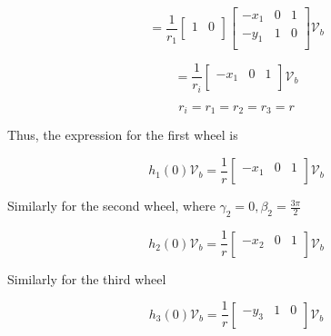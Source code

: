 \documentclass[12pt, twoside]{report}
\begin{document}
\begin{equation}
    = \frac{1}{r_1} \left[\begin{array}{cc}
            1 & 0 \\
        \end{array}\right]
    \begin{bmatrix}
        -x_1 & 0 & 1 \\
        -y_1 & 1 & 0 \\
    \end{bmatrix}
    \mathcal{V}_b
\end{equation}

\begin{equation}
    =
    \frac{1}{r_i}
    \begin{bmatrix}
        -x_1 & 0 & 1 \\
    \end{bmatrix}
    \mathcal{V}_b
\end{equation}

\begin{equation}
    r_i = r_1 = r_2 = r_3 = r
\end{equation}

Thus, the expression for the first wheel is

\begin{equation}
    h_1(0) \mathcal{V}_b = \frac{1}{r}
    \begin{bmatrix}
        -x_1 & 0 & 1 \\
    \end{bmatrix}
    \mathcal{V}_b
\end{equation}


Similarly for the second wheel, where $\gamma_2 = 0, \beta_2 = \frac{3\pi}{2}$

\begin{equation}
    h_2(0) \mathcal{V}_b = \frac{1}{r}
    \begin{bmatrix}
        -x_2 & 0 & 1 \\
    \end{bmatrix}
    \mathcal{V}_b
\end{equation}



Similarly for the third wheel

\begin{equation}
    h_3(0) \mathcal{V}_b = \frac{1}{r}
    \begin{bmatrix}
        -y_3 & 1 & 0 \\
    \end{bmatrix}
    \mathcal{V}_b
\end{equation}
\end{document}
